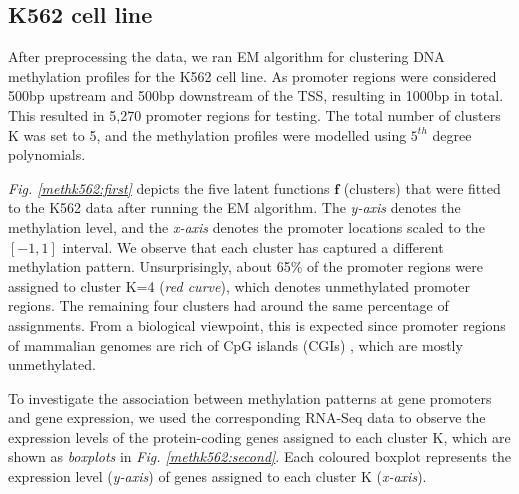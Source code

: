 \subsection{K562 cell line} \label{meth-encode-k562-subsect}
After preprocessing the data, we ran EM algorithm for clustering DNA methylation profiles for the K562 cell line. As promoter regions were considered 500bp upstream and 500bp downstream of the TSS, resulting in 1000bp in total. This resulted in 5,270 promoter regions for testing. The total number of clusters K was set to 5, and the methylation profiles were modelled using $5^{th}$ degree polynomials. 

\emph{Fig. \ref{methk562:first}} depicts the five latent functions $\mathbf{f}$ (\ie clusters) that were fitted to the K562 data after running the EM algorithm. The \emph{y-axis} denotes the methylation level, and the \emph{x-axis} denotes the promoter locations scaled to the $[-1, 1]$ interval. We observe that each cluster has captured a different methylation pattern. Unsurprisingly, about 65\% of the promoter regions were assigned to cluster K=4 (\emph{red curve}), which denotes unmethylated promoter regions. The remaining four clusters had around the same percentage of assignments. From a biological viewpoint, this is expected since promoter regions of mammalian genomes are rich of CpG islands (CGIs) \citep{Illingworth2009}, which are mostly unmethylated. 

To investigate the association between methylation patterns at gene promoters and gene expression, we used the corresponding RNA-Seq data to observe the expression levels of the protein-coding genes assigned to each cluster K, which are shown as \emph{boxplots} in \emph{Fig. \ref{methk562:second}}. Each coloured boxplot represents the expression level (\emph{y-axis}) of genes assigned to each cluster K (\emph{x-axis}). 

